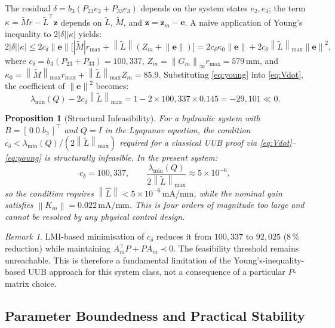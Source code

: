 \documentclass[12pt,a4paper]{article}
\theoremstyle{plain}
\newtheorem{proposition}[theorem]{Proposition}
\theoremstyle{definition}
\theoremstyle{remark}
\newtheorem{remark}[theorem]{Remark}
\newcommand{\norm}[1]{\left\|#1\right\|}
\newcommand{\abs}[1]{\left|#1\right|}
\newcommand{\Am}{A_m}           %
\newcommand{\Lh}{\hat{L}}       %
\newcommand{\Lt}{\tilde{L}}     %
\newcommand{\Mt}{\tilde{M}}     %
\newcommand{\dlt}{\delta}       %
\newcommand{\kap}{\kappa}       %
\newcommand{\ze}{\mathbf{z}}    %
\newcommand{\e}{\mathbf{e}}     %
\newcommand{\zm}{\mathbf{z}_m}  %
\begin{document}
The residual $\dlt=b_3(P_{23}e_2+P_{33}e_3)$ depends on the system
states $e_2,e_3$; the term $\kap=\Mt r - \Lt^\top\ze$ depends on
$\Lt$, $\Mt$, and $\ze=\zm-\e$.  A naive application of Young's
inequality to $2\abs{\dlt}\abs{\kap}$ yields:
\begin{equation}
2\abs{\dlt}\abs{\kap}
  \le 2c_\delta\norm{\e}\bigl[\abs{\Mt}r_{\max}
     + \norm{\Lt}(Z_m+\norm{\e})\bigr]
  = 2c_\delta\kappa_0\norm{\e} + 2c_\delta\norm{\Lt}_{\max}\norm{\e}^2,
\label{eq:young}
\end{equation}
where $c_\delta = b_3(P_{23}+P_{33})=100{,}337$,
$Z_m=\norm{G_m}_\infty r_{\max}=579\,\mathrm{mm}$, and
$\kappa_0 = \norm{\Mt}_{\max}r_{\max}+\norm{\Lt}_{\max}Z_m = 85.9$.
Substituting \eqref{eq:young} into \eqref{eq:Vdot}, the coefficient
of $\norm{\e}^2$ becomes:
\begin{equation}
\lambda_{\min}(Q) - 2c_\delta\norm{\Lt}_{\max}
  = 1 - 2\times100{,}337\times 0.145 = -29{,}101 \ll 0.
\label{eq:infeasible}
\end{equation}

\begin{proposition}[Structural Infeasibility]
\label{prop:infeasible}
For a hydraulic system with $B=[\,0\;0\;b_3\,]^\top$ and $Q=I$ in
the Lyapunov equation, the condition
$c_\delta < \lambda_{\min}(Q)/(2\norm{\Lt}_{\max})$ required for a
classical UUB proof via \eqref{eq:Vdot}--\eqref{eq:young} is
structurally infeasible.  In the present system:
\begin{equation}
c_\delta = 100{,}337, \qquad
\frac{\lambda_{\min}(Q)}{2\norm{\Lt}_{\max}} \approx 5\times10^{-6},
\end{equation}
so the condition requires $\norm{\Lh}<5\times10^{-6}\,\mathrm{mA/mm}$,
while the nominal gain satisfies $\norm{K_m}=0.022\,\mathrm{mA/mm}$.
This is four orders of magnitude too large and cannot be resolved by
any physical control design.
\end{proposition}

\begin{remark}
LMI-based minimisation of $c_\delta$ reduces it from $100{,}337$ to
$92{,}025$ (8\,\% reduction) while maintaining $\Am^\top P+P\Am\prec 0$.
The feasibility threshold remains unreachable.  This is therefore a
fundamental limitation of the Young's-inequality-based UUB approach
for this system class, not a consequence of a particular $P$-matrix
choice.
\end{remark}

\subsection{Parameter Boundedness and Practical Stability}
\end{document}
